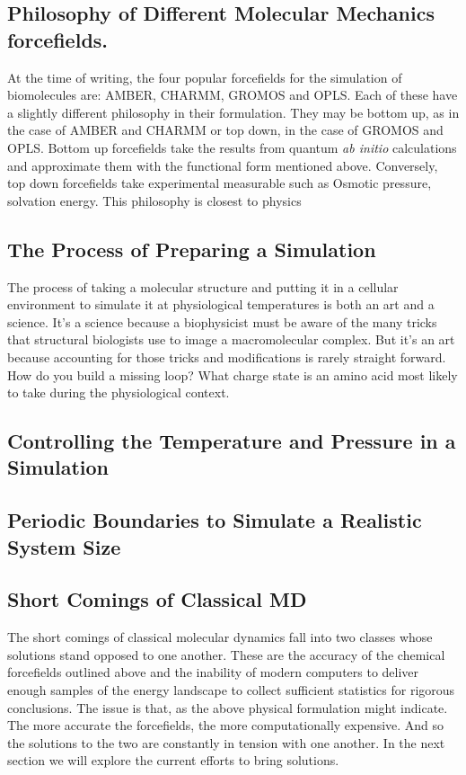 \subsection{Philosophy of Different Molecular Mechanics forcefields.}
At the time of writing, the four popular forcefields for the simulation of biomolecules are: AMBER, CHARMM, GROMOS and OPLS. Each of these have a slightly different philosophy in their formulation. They may be bottom up, as in the case of AMBER and CHARMM or top down, in the case of GROMOS and OPLS. Bottom up forcefields take the results from quantum \textit{ab initio} calculations and approximate them with the functional form mentioned above. Conversely, top down forcefields take experimental measurable such as Osmotic pressure, solvation energy. This philosophy is closest to physics 

\subsection{The Process of Preparing a Simulation}
The process of taking a molecular structure and putting it in a cellular environment to simulate it at physiological temperatures is both an art and a science. It's a science because a biophysicist must be aware of the many tricks that structural biologists use to image a macromolecular complex. But it's an art because accounting for those tricks and modifications is rarely straight forward. How do you build a missing loop? What charge state is an amino acid most likely to take during the physiological context.

\subsection{Controlling the Temperature and Pressure in a Simulation}

\subsection{Periodic Boundaries to Simulate a Realistic System Size}


\subsection{Short Comings of Classical MD}
The short comings of classical molecular dynamics fall into two classes whose solutions stand opposed to one another. These are the accuracy of the chemical forcefields outlined above and the inability of modern computers to deliver enough samples of the energy landscape to collect sufficient statistics for rigorous conclusions. The issue is that, as the above physical formulation might indicate. The more accurate the forcefields, the more computationally expensive. And so the solutions to the two are constantly in tension with one another. In the next section we will explore the current efforts to bring solutions.


